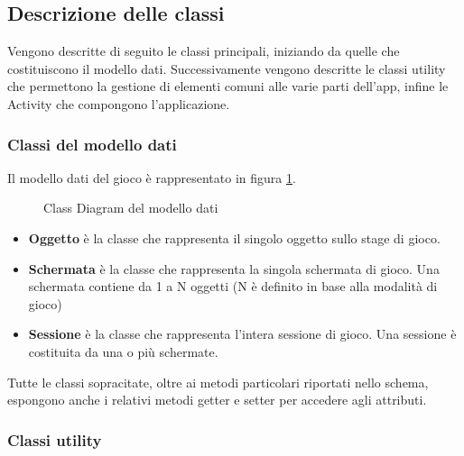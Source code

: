\subsection{Descrizione delle classi}
Vengono descritte di seguito le classi principali, iniziando da quelle che costituiscono il modello dati. Successivamente vengono descritte le classi utility che permettono la gestione di elementi comuni alle varie parti dell'app, infine le Activity che compongono l'applicazione.

\subsubsection{Classi del modello dati}
Il modello dati del gioco è rappresentato in figura \ref{fig:class}.

\begin{figure}[h!]
\caption{Class Diagram del modello dati}
\label{fig:class}
\end{figure}

\begin{itemize}
\item \textbf{Oggetto} è la classe che rappresenta il singolo oggetto sullo stage di gioco.
\item \textbf{Schermata} è la classe che rappresenta la singola schermata di gioco. Una schermata contiene da 1 a N oggetti (N è definito in base alla modalità di gioco)
\item \textbf{Sessione} è la classe che rappresenta l'intera sessione di gioco. Una sessione è costituita da una o più schermate.
\end{itemize}

Tutte le classi sopracitate, oltre ai metodi particolari riportati nello schema, espongono anche i relativi metodi getter e setter per accedere agli attributi.
\subsubsection{Classi utility}

